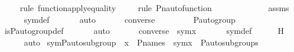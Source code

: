 \begin{isabellebody}
\ \ \ \ \isamarkupfalse%
{\isacharparenleft}{\kern0pt}rule\ function{\isacharunderscore}{\kern0pt}apply{\isacharunderscore}{\kern0pt}equality{\isacharparenright}{\kern0pt}\isanewline
\ \ \ \ \isamarkupfalse%
{\isacharparenleft}{\kern0pt}rule\ Pn{\isacharunderscore}{\kern0pt}auto{\isacharunderscore}{\kern0pt}function{\isacharparenright}{\kern0pt}\isanewline
\isanewline
\ \ \isamarkupfalse%
\ {\isachardoublequoteopen}{\isasympi}\ {\isasymin}\ {\isasymG}{\isachardoublequoteclose}\ \isanewline
\ \ \ \ \isamarkupfalse%
\ assms\isanewline
\ \ \ \ \isamarkupfalse%
\ sym{\isacharunderscore}{\kern0pt}def\ \isanewline
\ \ \ \ \isamarkupfalse%
\ auto\ \isanewline
\ \ \isamarkupfalse%
\ \isamarkupfalse%
\ {\isachardoublequoteopen}converse{\isacharparenleft}{\kern0pt}{\isasympi}{\isacharparenright}{\kern0pt}\ {\isasymin}\ {\isasymG}{\isachardoublequoteclose}\ \isanewline
\ \ \ \ \isamarkupfalse%
\ {\isasymG}{\isacharunderscore}{\kern0pt}P{\isacharunderscore}{\kern0pt}auto{\isacharunderscore}{\kern0pt}group\ \isanewline
\ \ \ \ \isamarkupfalse%
\ is{\isacharunderscore}{\kern0pt}P{\isacharunderscore}{\kern0pt}auto{\isacharunderscore}{\kern0pt}group{\isacharunderscore}{\kern0pt}def\ \isanewline
\ \ \ \ \isamarkupfalse%
\ auto\ \isanewline
\isanewline
\ \ \isamarkupfalse%
\ \isamarkupfalse%
\ {\isachardoublequoteopen}converse{\isacharparenleft}{\kern0pt}{\isasympi}{\isacharparenright}{\kern0pt}\ {\isasymin}\ sym{\isacharparenleft}{\kern0pt}x{\isacharparenright}{\kern0pt}{\isachardoublequoteclose}\ \isanewline
\ \ \ \ \isamarkupfalse%
\ sym{\isacharunderscore}{\kern0pt}def\isanewline
\ \ \ \ \isamarkupfalse%
\ H\ \isanewline
\ \ \ \ \isamarkupfalse%
\ auto\isanewline
{}\isamarkupfalse%
%
\endisatagproof
{\isafoldproof}%
%
\isadelimproof
\isanewline
%
\endisadelimproof
\isanewline
{}\isamarkupfalse%
\ sym{\isacharunderscore}{\kern0pt}P{\isacharunderscore}{\kern0pt}auto{\isacharunderscore}{\kern0pt}subgroup\ {\isacharcolon}{\kern0pt}\ {\isachardoublequoteopen}x\ {\isasymin}\ P{\isacharunderscore}{\kern0pt}names\ {\isasymLongrightarrow}\ sym{\isacharparenleft}{\kern0pt}x{\isacharparenright}{\kern0pt}\ {\isasymin}\ P{\isacharunderscore}{\kern0pt}auto{\isacharunderscore}{\kern0pt}subgroups{\isacharparenleft}{\kern0pt}{\isasymG}{\isacharparenright}{\kern0pt}{\isachardoublequoteclose}\ \isanewline

\end{isabellebody}
